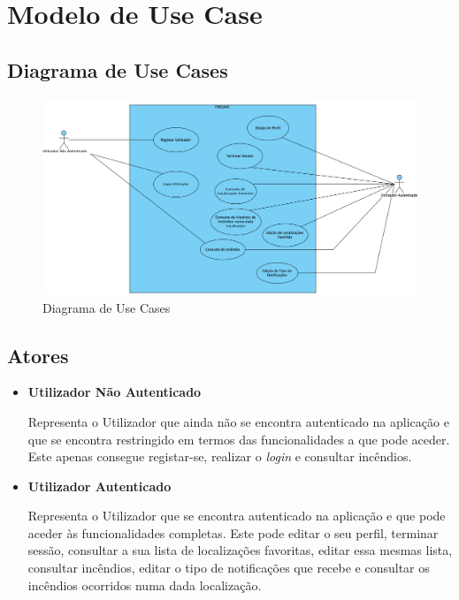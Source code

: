 \documentclass[a4paper,12pt]{scrreprt}
\begin{document}
\chapter{Modelo de Use Case}

\section{Diagrama de Use Cases}

\begin{figure}[H]
    \centering
    \includegraphics[width=.9\textwidth]{images/Fase2/4.ModeloDeUseCase/diagramaUseCases.png}
    \caption{Diagrama de Use Cases}
\end{figure}

\section{Atores}

\begin{itemize}
    \item \textbf{Utilizador Não Autenticado}
    
    Representa o Utilizador que ainda não se encontra autenticado na aplicação e que se encontra restringido em termos das funcionalidades a que pode aceder. Este apenas consegue registar-se, realizar o \textit{login} e consultar incêndios.
    
    \item \textbf{Utilizador Autenticado}
    
    Representa o Utilizador que se encontra autenticado na aplicação e que pode aceder às funcionalidades completas. Este pode editar o seu perfil, terminar sessão, consultar a sua lista de localizações favoritas, editar essa mesmas lista, consultar incêndios,  editar o tipo de notificações que recebe e consultar os incêndios ocorridos numa dada localização.
    
\end{itemize}
\end{document}
